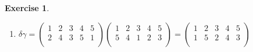 \documentclass[11pt,a4paper]{article}
\theoremstyle{definition}
\newtheorem{exe}[thm]{Exercise}
\begin{document}
\begin{exe}
\begin{enumerate}
\item[(b)] $\delta\gamma = \begin{pmatrix}
1 & 2 & 3 & 4 & 5\\
2 & 4 & 3 & 5 & 1\\
\end{pmatrix}\begin{pmatrix}
1 & 2 & 3 & 4 & 5\\
5 & 4 & 1 & 2 & 3\\
\end{pmatrix} = \begin{pmatrix}
1 & 2 & 3 & 4 & 5\\
1 & 5 & 2 & 4 & 3\\
\end{pmatrix}$\\\\





\end{enumerate}
\end{exe}
\end{document}
